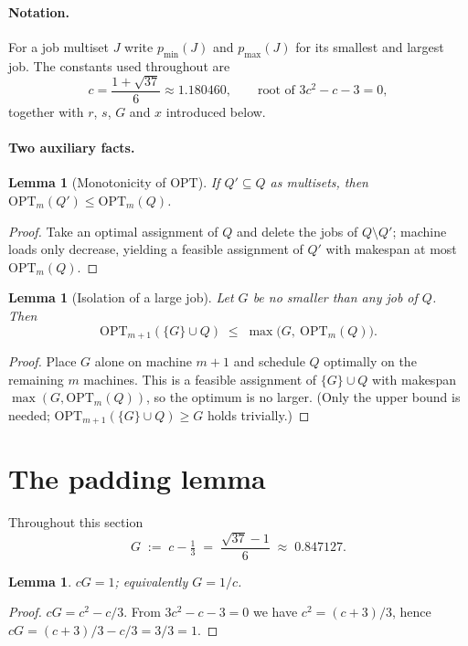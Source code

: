 \documentclass[11pt]{article}
\newtheorem{lemma}[theorem]{Lemma}
\theoremstyle{definition}
\newcommand{\opt}{\mathrm{OPT}}
\begin{document}
\paragraph{Notation.}
For a job multiset $J$ write $p_{\min}(J)$ and $p_{\max}(J)$ for its smallest
and largest job. The constants used throughout are
\[
c=\frac{1+\sqrt{37}}{6}\approx 1.180460,
\qquad\text{root of } 3c^{2}-c-3=0,
\]
together with $r$, $s$, $G$ and $x$ introduced below.

\paragraph{Two auxiliary facts.}
\begin{lemma}[Monotonicity of $\opt$]
\label{lem:mono}
If $Q'\subseteq Q$ as multisets, then $\opt_{m}(Q')\le\opt_{m}(Q)$.
\end{lemma}
\begin{proof}
Take an optimal assignment of $Q$ and delete the jobs of $Q\setminus Q'$;
machine loads only decrease, yielding a feasible assignment of $Q'$ with
makespan at most $\opt_{m}(Q)$.
\end{proof}

\begin{lemma}[Isolation of a large job]
\label{lem:isolate}
Let $G$ be no smaller than any job of $Q$. Then
\[
\opt_{m+1}(\{G\}\cup Q)\;\le\;\max\bigl(G,\ \opt_{m}(Q)\bigr).
\]
\end{lemma}
\begin{proof}
Place $G$ alone on machine $m+1$ and schedule $Q$ optimally on the remaining
$m$ machines. This is a feasible assignment of $\{G\}\cup Q$ with makespan
$\max(G,\opt_{m}(Q))$, so the optimum is no larger. (Only the upper bound is
needed; $\opt_{m+1}(\{G\}\cup Q)\ge G$ holds trivially.)
\end{proof}

\section{The padding lemma}
\label{sec:padding}

Throughout this section
\[
G \;:=\; c-\tfrac13 \;=\; \frac{\sqrt{37}-1}{6}\;\approx\;0.847127 .
\]
\begin{lemma}
\label{lem:cG}
$cG=1$; equivalently $G=1/c$.
\end{lemma}
\begin{proof}
$cG=c^{2}-c/3$. From $3c^{2}-c-3=0$ we have $c^{2}=(c+3)/3$, hence
$cG=(c+3)/3-c/3=3/3=1$.
\end{proof}
\end{document}
